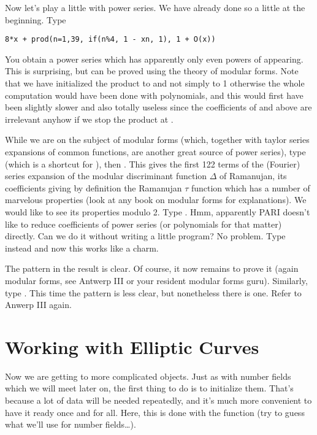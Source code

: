 Now let's play a little with power series. We have already done so a little
at the beginning.  Type

\centerline{\tt 8*x + prod(n=1,39, if(n\%4, 1 - x\pow n, 1),
                           1 + O(x))}

  You obtain a power series which has apparently only even powers of 
appearing. This is surprising, but can be proved using the theory of modular
forms. Note that we have initialized the product to  and
not simply to 1 otherwise the whole computation would have been done with
polynomials, and this would first have been slightly slower and also totally
useless since the coefficients of  and above are irrelevant
anyhow if we stop the product at .

While we are on the subject of modular forms (which, together with taylor
series expansions of common functions, are another great source of power
series), type  (which is a shortcut for
), then . This
gives the first 122 terms of the (Fourier) series expansion of the modular
discriminant function $\Delta$ of Ramanujan, its coefficients giving by
definition the Ramanujan $\tau$ function which has a number of marvelous
properties (look at any book on modular forms for explanations). We would like
to see its properties modulo 2. Type . Hmm, apparently PARI
doesn't like to
reduce coefficients of power series (or polynomials for that matter) directly.
Can we do it without writing a little program? No problem. Type instead
 and now this works like a charm.

The pattern in the result is clear. Of course, it now remains to prove it
(again modular forms, see Antwerp III or your resident modular forms guru).
Similarly, type . This time the pattern is
less clear, but nonetheless there is one. Refer to Anwerp III again.

\section{Working with Elliptic Curves}

Now we are getting to more complicated objects. Just as with number fields
which we will meet later on, the first thing to do is to initialize them.
That's because a lot of data will be needed repeatedly, and it's much more
convenient to have it ready once and for all. Here, this is done with the
function  (try to guess what we'll use for number fields\dots).

